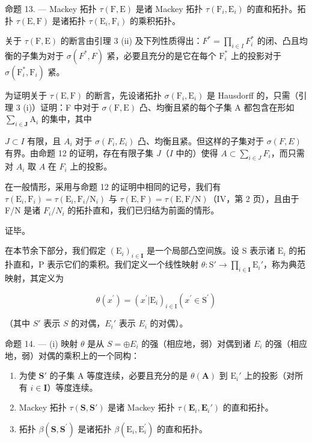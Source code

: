命题 13. --- Mackey 拓扑 \(\tau(\mathrm{F},\mathrm{E})\) 是诸 Mackey 拓扑 \(\tau(\mathrm{F}_i,\mathrm{E}_i)\) 的直和拓扑。拓扑 \(\tau(\mathrm{E},\mathrm{F})\) 是诸拓扑 \(\tau(\mathrm{E}_i,\mathrm{F}_i)\) 的乘积拓扑。

关于 \(\tau(\mathrm{F},\mathrm{E})\) 的断言由引理 3 (ii) 及下列性质得出：\(F^{*} = \prod_{i\in I}F_{i}^{*}\) 的闭、凸且均衡的子集为对于 \(\sigma(F^{*},F)\) 紧，必要且充分的是它在每个 \(\mathrm{F}_i^*\) 上的投影对于 \(\sigma(\mathrm{F}_i^*, \mathrm{F}_i)\) 紧。

为证明关于 \(\tau(\mathrm{E},\mathrm{F})\) 的断言，先设诸拓扑 \(\sigma(\mathrm{F}_i,\mathrm{E}_i)\) 是 Hausdorff 的，只需（引理 3 (i)）证明：F 中对于 \(\sigma(\mathrm{F},\mathrm{E})\) 凸、均衡且紧的每个子集 A 都包含在形如 \(\sum_{i\in\mathbf{J}}\mathrm{A}_i\) 的集中，其中

\(J \subset I\) 有限，且 \(A_{i}\) 对于 \(\sigma(F_{i}, E_{i})\) 凸、均衡且紧。但这样的子集对于 \(\sigma(F, E)\) 有界。由命题 12 的证明，存在有限子集 \(J\)（\(I\) 中的）使得 \(A \subset \sum_{i \in J} F_i\)，而只需对 \(A_i\) 取 \(A\) 在 \(F_i\) 上的投影。

在一般情形，采用与命题 12 的证明中相同的记号，我们有 \(\tau(\mathrm{E}_{i},\mathrm{F}_{i})=\tau(\mathrm{E}_{i},\mathrm{F}_{i}/\mathrm{N}_{i})\) 与 \(\tau(\mathrm{E},\mathrm{F})=\tau(\mathrm{E},\mathrm{F}/\mathrm{N})\)（IV，第 2 页），且由于 F/N 是诸 \(F_{i}/N_{i}\) 的拓扑直和，我们已归结为前面的情形。

证毕。

在本节余下部分，我们假定 \((\mathrm{E}_i)_{i\in \mathbf{I}}\) 是一个局部凸空间族。设 S 表示诸 \(\mathrm{E}_i\) 的拓扑直和，P 表示它们的乘积。我们定义一个线性映射 \(\theta :\mathrm{S}'\to \prod_{i\in \mathbf{I}}\mathrm{E}_i'\)，称为典范映射，其定义为

\[
\theta (x ^ {\prime}) = (x ^ {\prime} | \mathrm{E} _ {i}) _ {i \in \mathrm{I}} (x ^ {\prime} \in \mathrm{S} ^ {\prime})\tag{10}
\]

（其中 \(S'\) 表示 \(S\) 的对偶，\(E_i'\) 表示 \(E_i\) 的对偶）。

命题 14. --- (i) 映射 \(\theta\) 是从 \(S = \oplus E_i\) 的强（相应地，弱）对偶到诸 \(E_i\) 的强（相应地，弱）对偶的乘积上的一个同构：

\begin{enumerate}
\def\labelenumi{(\roman{enumi})}
\setcounter{enumi}{1}
\item
  为使 \(\mathbf{S}'\) 的子集 A 等度连续，必要且充分的是 \(\theta (\mathbf{A})\) 到 \(\mathrm{E}_i'\) 上的投影（对所有 \(i\in \mathbf{I}\)）等度连续。
\item
  Mackey 拓扑 \(\tau(\mathbf{S},\mathbf{S}')\) 是诸 Mackey 拓扑 \(\tau(\mathbf{E}_i,\mathbf{E}_i')\) 的直和拓扑。
\item
  拓扑 \(\beta (\mathbf{S},\mathbf{S}^{\prime})\) 是诸拓扑 \(\beta (\mathrm{E}_i,\mathrm{E}_i^{\prime})\) 的直和拓扑。
\end{enumerate}

